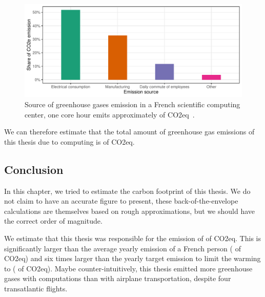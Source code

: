         \begin{figure}[htpb]
            \centering
            \includegraphics[width=\linewidth]{img/appendix/carbon/co2_per_hour.pdf}
            \caption{Source of greenhouse gases emission in a French scientific computing center, one core hour emits
            approximately  of CO2eq~\cite{corehour_co2}.}%
            \label{fig:appendix:co2_per_hour}
        \end{figure}

        We can therefore estimate that the total amount of greenhouse gas emissions of this thesis due to computing is
         of CO2eq.

        \subsection*{Conclusion}

            In this chapter, we tried to estimate the carbon footprint of this thesis. We do not claim to have an
            accurate figure to present, these back-of-the-envelope calculations are themselves based on rough
            approximations, but we should have the correct order of magnitude.

            We estimate that this thesis was responsible for the emission of  of CO2eq. This is
            significantly larger than the average yearly emission of a French person ( of CO2eq) and six
            times larger than the yearly target emission to limit the warming to  ( of
            CO2eq). Maybe counter-intuitively, this thesis emitted more greenhouse gases with computations than with
            airplane transportation, despite four transatlantic flights.
